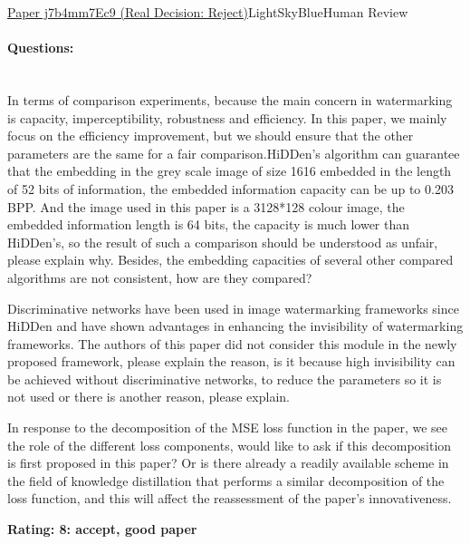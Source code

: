 \documentclass{article} %
\begin{document}
\begin{reviewbox}{\href{https://openreview.net/forum?id=j7b4mm7Ec9}{Paper j7b4mm7Ec9 (Real Decision: Reject)}}{LightSkyBlue}{Human Review}
\paragraph{Questions:}\leavevmode\\[0.1em]
In terms of comparison experiments, because the main concern in watermarking is capacity, imperceptibility, robustness and efficiency. In this paper, we mainly focus on the efficiency improvement, but we should ensure that the other parameters are the same for a fair comparison.HiDDen's algorithm can guarantee that the embedding in the grey scale image of size 1616 embedded in the length of 52 bits of information, the embedded information capacity can be up to 0.203 BPP. And the image used in this paper is a 3128*128 colour image, the embedded information length is 64 bits, the capacity is much lower than HiDDen's, so the result of such a comparison should be understood as unfair, please explain why. Besides, the embedding capacities of several other compared algorithms are not consistent, how are they compared?

Discriminative networks have been used in image watermarking frameworks since HiDDen and have shown advantages in enhancing the invisibility of watermarking frameworks. The authors of this paper did not consider this module in the newly proposed framework, please explain the reason, is it because high invisibility can be achieved without discriminative networks, to reduce the parameters so it is not used or there is another reason, please explain.

In response to the decomposition of the MSE loss function in the paper, we see the role of the different loss components, would like to ask if this decomposition is first proposed in this paper? Or is there already a readily available scheme in the field of knowledge distillation that performs a similar decomposition of the loss function, and this will affect the reassessment of the paper's innovativeness.

\textbf{Rating: 8: accept, good paper}

\end{reviewbox}
\end{document}
